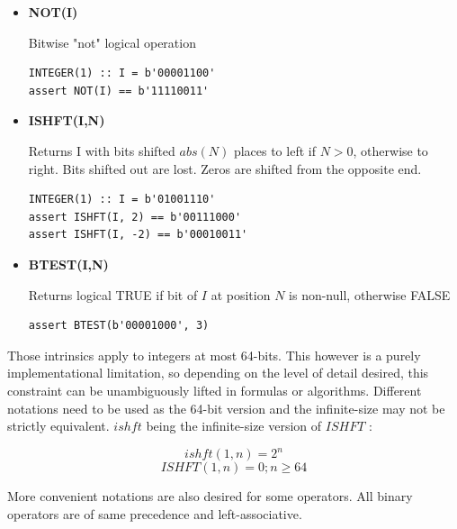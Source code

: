 \begin{itemize}
	      
	\item \textbf{NOT(I)}
	            
	      Bitwise "not" logical operation
	\begin{lstlisting}
INTEGER(1) :: I = b'00001100'
assert NOT(I) == b'11110011'
	\end{lstlisting}
	      
	      
	\item \textbf{ISHFT(I,N)}
	            
	      Returns I with bits shifted $abs(N)$ places to left if $N>0$, otherwise to right. Bits shifted out are lost. Zeros are shifted from the opposite end.
	\begin{lstlisting}
INTEGER(1) :: I = b'01001110'
assert ISHFT(I, 2) == b'00111000'
assert ISHFT(I, -2) == b'00010011'
	\end{lstlisting}
	      
	      
	\item \textbf{BTEST(I,N)}
	            
	      Returns logical TRUE if bit of $I$ at position $N$ is non-null, otherwise FALSE
	\begin{lstlisting}
assert BTEST(b'00001000', 3)
	\end{lstlisting}
	      
\end{itemize}
      
      
Those intrinsics apply to integers at most 64-bits. This however is a purely implementational limitation, so depending on the level of detail desired, this constraint can be unambiguously lifted in formulas or algorithms. Different notations need to be used as the 64-bit version and the infinite-size may not be strictly equivalent. $ishft$ being the infinite-size version of $ISHFT$ :

$$ishft(1, n) = 2^{n}$$
$$ISHFT(1, n) = 0 ; n \geq 64$$

More convenient notations are also desired for some operators. All binary operators are of same precedence and left-associative.

